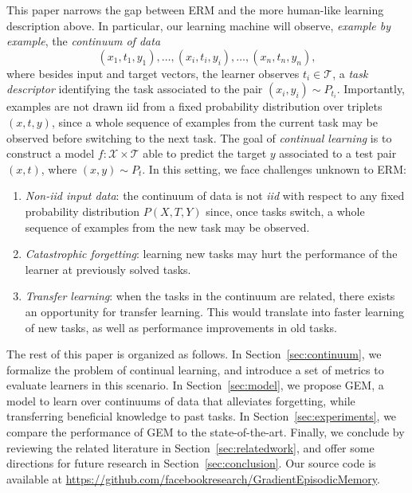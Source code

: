 \documentclass{article}
\newcommand{\X}{\mathcal{X}}
\newcommand{\T}{\mathcal{T}}
\begin{document}
This paper narrows the gap between ERM and the more human-like learning
description above. In particular, our learning machine will observe,
\emph{example by example}, the \emph{continuum of data}
\begin{equation}\label{eq:continuum}
(x_1, t_1, y_1), \ldots, (x_i, t_i, y_i), \ldots, (x_n, t_n, y_n),
\end{equation}
where besides input and target vectors, the learner observes $t_i \in \T$, a
\emph{task descriptor} identifying the task associated to the pair $(x_i, y_i)
\sim P_{t_i}$.  Importantly, examples are not drawn iid from a fixed
probability distribution over triplets $(x,t,y)$, since a whole sequence of
examples from the current task may be observed before switching to the next
task.  The goal of \emph{continual learning} is to construct a model $f : \X
\times \T$ able to predict the target $y$ associated to a test pair $(x, t)$,
where $(x, y) \sim P_t$. In this setting, we face challenges unknown to ERM:
\begin{enumerate}
  \item \emph{Non-iid input data}: the continuum of data is not \emph{iid} with
  respect to any fixed probability distribution $P(X,T,Y)$ since, once tasks
  switch, a whole sequence of examples from the new task may be observed.
  \item \emph{Catastrophic forgetting}: learning new tasks may hurt the
  performance of the learner at previously solved tasks.
  \item \emph{Transfer learning}: when the tasks in the continuum are related,
  there exists an opportunity for transfer learning. This would translate into
  faster learning of new tasks, as well as performance improvements in old
  tasks.
\end{enumerate}

The rest of this paper is organized as follows. In Section~\ref{sec:continuum},
we formalize the problem of continual learning, and introduce a set of metrics
to evaluate learners in this scenario.  In Section~\ref{sec:model}, we propose
GEM, a model to learn over continuums of data that alleviates forgetting, while
transferring beneficial knowledge to past tasks.  In
Section~\ref{sec:experiments}, we compare the performance of GEM to the
state-of-the-art.  Finally, we conclude by reviewing the related literature in
Section~\ref{sec:relatedwork}, and offer some directions for future research in
Section~\ref{sec:conclusion}. Our source code is available at
\url{https://github.com/facebookresearch/GradientEpisodicMemory}.
\end{document}
